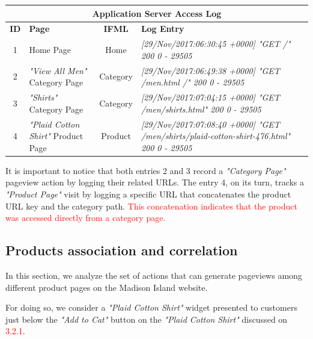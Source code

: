 \vspace{0.5cm}
\begin{center}
  \begin{tabular}{|c|p{3cm}|c|p{6cm}|}
  \hline
  \multicolumn{4}{|c|}{Application Server Access Log}\\ \hline
  \textbf{ID}&\textbf{Page}&\textbf{IFML}&\textbf{Log Entry}   \\ \hline
  1&Home Page&Home&\em[29/Nov/2017:06:30:45 +0000] "GET /" 200 0 - 29505 \\ \hline
  2&\textit{"View All Men"} Category Page &Category&\em[29/Nov/2017:06:49:38 +0000] "GET /men.html /" 200 0 - 29505 
  \\ \hline
  3&\textit{"Shirts"} Category Page &Category&\em[29/Nov/2017:07:04:15 +0000] "GET /men/shirts.html" 200 0 - 29505
  \\ \hline
  4&\textit{"Plaid Cotton Shirt"} Product Page &Product&\em[29/Nov/2017:07:08:40 +0000] "GET /men/shirts/plaid-cotton-shirt-476.html" 200 0 - 29505
  \\ \hline
  \end{tabular}
  \end{center}
  \vspace{0.5cm}

  It is important to notice that both entries 2 and 3 record a \textit{"Category Page"} pageview action by logging their related URLs. The entry 4, on its turn, tracks a \textit{"Product Page"} visit by logging a specific URL that concatenates the product URL key and the category path. \textcolor{red}{This concatenation indicates that the product was accessed directly from a category page.}


\subsection{Products association and correlation}

In this section, we analyze the set of actions that can generate pageviews among different product pages on the Madison Island website. 

For doing so, we consider a \textit{"Plaid Cotton Shirt"} widget presented to customers just below the \textit{"Add to Cat"} button on the \textit{"Plaid Cotton Shirt"} discussed on \textcolor{red}{3.2.1}.

